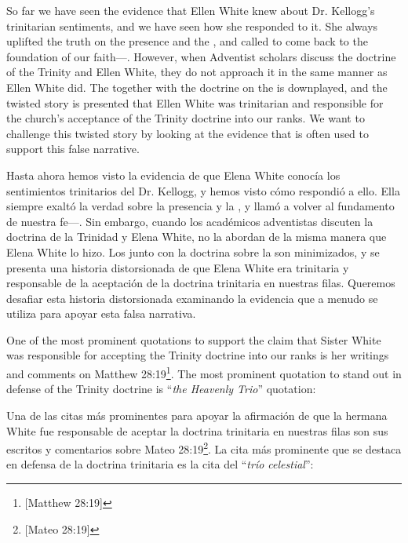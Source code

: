 



So far we have seen the evidence that Ellen White knew about Dr. Kellogg's trinitarian sentiments, and we have seen how she responded to it. She always uplifted the truth on the presence and the , and called to come back to the foundation of our faith—. However, when Adventist scholars discuss the doctrine of the Trinity and Ellen White, they do not approach it in the same manner as Ellen White did. The  together with the doctrine on the  is downplayed, and the twisted story is presented that Ellen White was trinitarian and responsible for the church's acceptance of the Trinity doctrine into our ranks. We want to challenge this twisted story by looking at the evidence that is often used to support this false narrative.


Hasta ahora hemos visto la evidencia de que Elena White conocía los sentimientos trinitarios del Dr. Kellogg, y hemos visto cómo respondió a ello. Ella siempre exaltó la verdad sobre la presencia y la , y llamó a volver al fundamento de nuestra fe—. Sin embargo, cuando los académicos adventistas discuten la doctrina de la Trinidad y Elena White, no la abordan de la misma manera que Elena White lo hizo. Los  junto con la doctrina sobre la  son minimizados, y se presenta una historia distorsionada de que Elena White era trinitaria y responsable de la aceptación de la doctrina trinitaria en nuestras filas. Queremos desafiar esta historia distorsionada examinando la evidencia que a menudo se utiliza para apoyar esta falsa narrativa.


One of the most prominent quotations to support the claim that Sister White was responsible for accepting the Trinity doctrine into our ranks is her writings and comments on Matthew 28:19\footnote{[Matthew 28:19]}. The most prominent quotation to stand out in defense of the Trinity doctrine is “\textit{the Heavenly Trio}” quotation:


Una de las citas más prominentes para apoyar la afirmación de que la hermana White fue responsable de aceptar la doctrina trinitaria en nuestras filas son sus escritos y comentarios sobre Mateo 28:19\footnote{[Mateo 28:19]}. La cita más prominente que se destaca en defensa de la doctrina trinitaria es la cita del “\textit{trío celestial}”:


